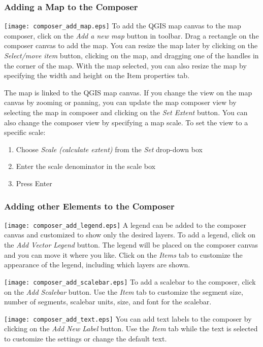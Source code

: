 \subsubsection{Adding a Map to the Composer}

\texttt{[image: composer\_add\_map.eps]} To add
the QGIS map canvas to the map composer, click on the \textit{Add a new
map} button in toolbar. Drag a rectangle on the composer canvas to add the
map. You can resize the map later by clicking on the \textit{Select/move item}
button, clicking on the map, and dragging one of the handles in the corner of
the map. With the map selected, you can also resize the map by specifying the
width and height on the Item properties tab.

The map is linked to the QGIS map canvas. If you change the view on the map
canvas by zooming or panning, you can update the map composer view by
selecting the map in composer and clicking on the \textit{Set Extent} button.
You can also change the composer view by specifying a map scale. To set the
view to a specific scale:

\begin{enumerate}
\item Choose \textit{Scale (calculate extent)} from the \textit{Set} drop-down
box
\item Enter the scale denominator in the scale box
\item Press Enter
\end{enumerate} 

\subsubsection{Adding other Elements to the Composer}

\texttt{[image: composer\_add\_legend.eps]} A
legend can be added to the composer canvas and customized to show only the
desired layers. To add a legend, click on the \textit{Add Vector Legend}
button. The legend will be placed on the composer canvas and you can move it
where you like. Click on the \textit{Items} tab to customize the appearance of
the legend, including which layers are shown.

\texttt{[image: composer\_add\_scalebar.eps]} To
add a scalebar to the composer, click on the \textit{Add Scalebar} button. Use
the \textit{Item} tab to customize the segment size, number of segments,
scalebar units, size, and font for the scalebar.

\texttt{[image: composer\_add\_text.eps]} You can
add text labels to the composer by clicking on the \textit{Add New Label}
button. Use the \textit{Item} tab while the text is selected to customize the
settings or change the default text.

